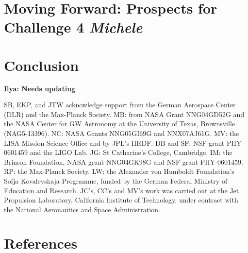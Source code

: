 \documentclass{iopart}
\newcommand{\ilya}[1]{{\color{red} \bf Ilya: #1}}
\begin{document}
\section{Moving Forward: Prospects for Challenge 4 {\it Michele}}

\section{Conclusion}

\ack

\ilya{Needs updating}

SB, EKP, and JTW acknowledge support from the German Aerospace Center (DLR) and the Max-Planck Society.
MB: from NASA Grant NNG04GD52G and the NASA Center for GW Astronomy at the University of Texas, Brownsville (NAG5-13396). 
NC: NASA Grants NNG05GI69G and NNX07AJ61G.
MV: the LISA Mission Science Office and by JPL's HRDF.
DB and SF: NSF grant PHY-0601459 and the LIGO Lab.
JG: St Catharine's College, Cambridge.
IM: the Brinson Foundation, NASA grant NNG04GK98G and NSF grant PHY-0601459.
RP: the Max-Planck Society.
LW: the Alexander von Humboldt Foundation's Sofja Kovalevskaja Programme, funded by the German Federal Ministry of Education and Research.
JC's, CC's and MV's work was carried out at the Jet Propulsion Laboratory, California Institute of Technology, under contract with the National Aeronautics and Space Administration.


\section*{References}
\end{document}
